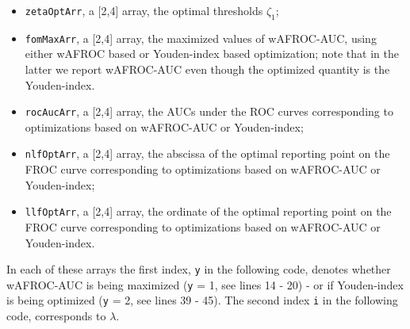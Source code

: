 \documentclass[
]{book}
\providecommand{\tightlist}{%
  \setlength{\itemsep}{0pt}\setlength{\parskip}{0pt}}
\begin{document}
\begin{itemize}
\tightlist
\item
  \texttt{zetaOptArr}, a {[}2,4{]} array, the optimal thresholds \(\zeta_1\);
\item
  \texttt{fomMaxArr}, a {[}2,4{]} array, the maximized values of wAFROC-AUC, using either wAFROC based or Youden-index based optimization; note that in the latter we report wAFROC-AUC even though the optimized quantity is the Youden-index.
\item
  \texttt{rocAucArr}, a {[}2,4{]} array, the AUCs under the ROC curves corresponding to optimizations based on wAFROC-AUC or Youden-index;\\
\item
  \texttt{nlfOptArr}, a {[}2,4{]} array, the abscissa of the optimal reporting point on the FROC curve corresponding to optimizations based on wAFROC-AUC or Youden-index;\\
\item
  \texttt{llfOptArr}, a {[}2,4{]} array, the ordinate of the optimal reporting point on the FROC curve corresponding to optimizations based on wAFROC-AUC or Youden-index.
\end{itemize}

In each of these arrays the first index, \texttt{y} in the following code, denotes whether wAFROC-AUC is being maximized (\texttt{y} = 1, see lines 14 - 20) - or if Youden-index is being optimized (\texttt{y} = 2, see lines 39 - 45). The second index \texttt{i} in the following code, corresponds to \(\lambda\).
\end{document}
